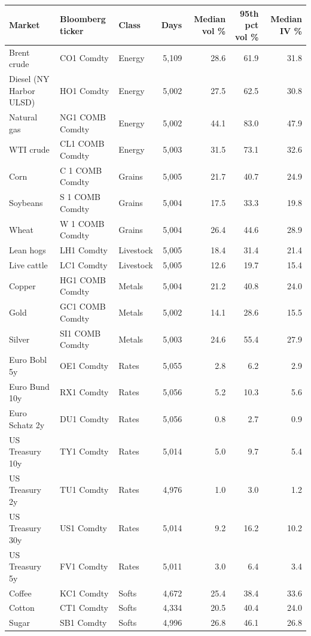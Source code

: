 \begin{tabular}{lllrrrr}
\toprule
Market & Bloomberg ticker & Class & Days & Median vol \% & 95th pct vol \% & Median IV \% \\
\midrule
Brent crude & CO1 Comdty & Energy & 5{,}109 & 28.6 & 61.9 & 31.8 \\
Diesel (NY Harbor ULSD) & HO1 Comdty & Energy & 5{,}002 & 27.5 & 62.5 & 30.8 \\
Natural gas & NG1 COMB Comdty & Energy & 5{,}002 & 44.1 & 83.0 & 47.9 \\
WTI crude & CL1 COMB Comdty & Energy & 5{,}003 & 31.5 & 73.1 & 32.6 \\
Corn & C 1 COMB Comdty & Grains & 5{,}005 & 21.7 & 40.7 & 24.9 \\
Soybeans & S 1 COMB Comdty & Grains & 5{,}004 & 17.5 & 33.3 & 19.8 \\
Wheat & W 1 COMB Comdty & Grains & 5{,}004 & 26.4 & 44.6 & 28.9 \\
Lean hogs & LH1 Comdty & Livestock & 5{,}005 & 18.4 & 31.4 & 21.4 \\
Live cattle & LC1 Comdty & Livestock & 5{,}005 & 12.6 & 19.7 & 15.4 \\
Copper & HG1 COMB Comdty & Metals & 5{,}004 & 21.2 & 40.8 & 24.0 \\
Gold & GC1 COMB Comdty & Metals & 5{,}002 & 14.1 & 28.6 & 15.5 \\
Silver & SI1 COMB Comdty & Metals & 5{,}003 & 24.6 & 55.4 & 27.9 \\
Euro Bobl 5y & OE1 Comdty & Rates & 5{,}055 & 2.8 & 6.2 & 2.9 \\
Euro Bund 10y & RX1 Comdty & Rates & 5{,}056 & 5.2 & 10.3 & 5.6 \\
Euro Schatz 2y & DU1 Comdty & Rates & 5{,}056 & 0.8 & 2.7 & 0.9 \\
US Treasury 10y & TY1 Comdty & Rates & 5{,}014 & 5.0 & 9.7 & 5.4 \\
US Treasury 2y & TU1 Comdty & Rates & 4{,}976 & 1.0 & 3.0 & 1.2 \\
US Treasury 30y & US1 Comdty & Rates & 5{,}014 & 9.2 & 16.2 & 10.2 \\
US Treasury 5y & FV1 Comdty & Rates & 5{,}011 & 3.0 & 6.4 & 3.4 \\
Coffee & KC1 Comdty & Softs & 4{,}672 & 25.4 & 38.4 & 33.6 \\
Cotton & CT1 Comdty & Softs & 4{,}334 & 20.5 & 40.4 & 24.0 \\
Sugar & SB1 Comdty & Softs & 4{,}996 & 26.8 & 46.1 & 26.8 \\
\bottomrule
\end{tabular}

